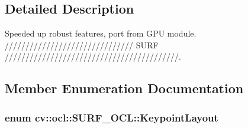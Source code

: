\subsection{Detailed Description}
Speeded up robust features, port from G\-P\-U module. /////////////////////////////// S\-U\-R\-F //////////////////////////////////////////. 

\subsection{Member Enumeration Documentation}
\hypertarget{classcv_1_1ocl_1_1SURF__OCL_a4170a69e35ab5bfd09754c4132a69df9}{
\subsubsection[{Keypoint\-Layout}]{\setlength{\rightskip}{0pt plus 5cm}enum {\bf cv\-::ocl\-::\-S\-U\-R\-F\-\_\-\-O\-C\-L\-::\-Keypoint\-Layout}}}\label{classcv_1_1ocl_1_1SURF__OCL_a4170a69e35ab5bfd09754c4132a69df9}
